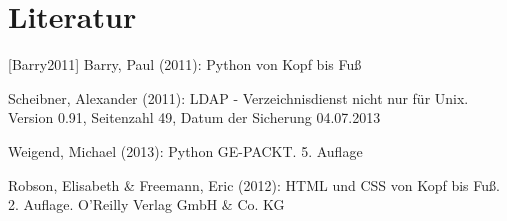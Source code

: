 \newpage
\section{Literatur}
[Barry2011] Barry, Paul (2011): Python von Kopf bis Fuß
\newline
\par\smallskip
[Scheibner2011][PDF] Scheibner, Alexander (2011): LDAP - Verzeichnisdienst nicht nur für Unix. Version 0.91, Seitenzahl 49, Datum der Sicherung 04.07.2013
\newline
\par\smallskip
[Weigend2013] Weigend, Michael (2013): Python GE-PACKT. 5. Auflage
\newline
\par{} Robson, Elisabeth \& Freemann, Eric (2012): HTML und CSS von Kopf bis Fuß. 2. Auflage. O'Reilly Verlag GmbH \& Co. KG


